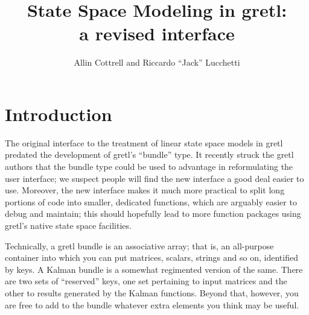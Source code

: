 \documentclass[a4paper]{article}
\begin{document}
\newcommand{\obsvec}{y}
\newcommand{\obsymat}{H}
\newcommand{\obsx}{x}
\newcommand{\obsxmat}{A}
\newcommand{\obsdist}{w}
\newcommand{\obsvar}{R}

\newcommand{\statevec}{\alpha}
\newcommand{\statecvar}{P}
\newcommand{\statemat}{F}
\newcommand{\strdist}{v}
\newcommand{\statevar}{Q}
\newcommand{\gain}{K}
\newcommand{\statemu}{\mu}

\newcommand{\altstatevar}{B}
\newcommand{\altobsvar}{C}
\newcommand{\alldist}{\varepsilon}

\newcommand{\prederr}{e}
\newcommand{\predvar}{\Sigma}

\newcommand{\myvec}{\mbox{vec}}
\newcommand{\myvech}{\mbox{vech}}

\makeatletter
\def\pdots{\vbox{\baselineskip2.5\p@ 
  \lineskiplimit\z@ \kern2\p@\hbox{.}\hbox{.}\hbox{.}\hbox{.}}}
\makeatother

\setlength{\parindent}{0pt}
\setlength{\parskip}{1ex}

\title{State Space Modeling in gretl:\\a revised interface}
\author{Allin Cottrell and Riccardo ``Jack'' Lucchetti}
\maketitle

\section{Introduction}
\label{sec:amble}

The original interface to the treatment of linear state space models
in gretl predated the development of gretl's ``bundle'' type. It
recently struck the gretl authors that the bundle type could be used
to advantage in reformulating the user interface; we suspect people
will find the new interface a good deal easier to use. Moreover, the
new interface makes it much more practical to split long portions of
code into smaller, dedicated functions, which are arguably easier to
debug and maintain; this should hopefully lead to more function
packages using gretl's native state space facilities.

Technically, a gretl bundle is an associative array; that is, an
all-purpose container into which you can put matrices, scalars,
strings and so on, identified by keys. A Kalman bundle is a somewhat
regimented version of the same. There are two sets of ``reserved''
keys, one set pertaining to input matrices and the other to results
generated by the Kalman functions.  Beyond that, however, you are free
to add to the bundle whatever extra elements you think may be useful.
\end{document}
